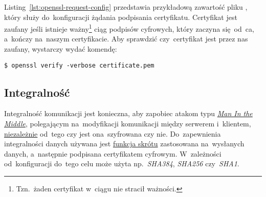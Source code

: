 \documentclass[thesis]{subfiles}
\begin{document}
Listing~\ref{lst:openssl-request-config} przedstawia przykładową zawartość pliku , który służy do~konfiguracji żądania podpisania certyfikatu. Certyfikat jest zaufany jeśli istnieje ważny\footnote{Tzn.~żaden certyfikat w~ciągu nie stracił ważności.} ciąg podpisów cyfrowych, który zaczyna się~od~\gls{ca}, a~kończy na~naszym certyfikacie. Aby sprawdzić czy~certyfikat jest przez nas zaufany, wystarczy wydać komendę:
\begin{lstlisting}[numbers=none]
$ openssl verify -verbose certificate.pem
\end{lstlisting}


\subsection{Integralność}

Integralność komunikacji jest konieczna, aby zapobiec atakom typu \emph{\hyperlink{itm:mitm}{Man In the Middle}}, polegającym na~modyfikacji komunikacji między serwerem i~klientem, \href{https://en.wikipedia.org/wiki/Digital_signature\#Integrity}{niezależnie} od~tego czy jest ona~szyfrowana czy nie. Do~zapewnienia integralności danych używana jest \href{https://www.ibm.com/support/knowledgecenter/SSFKSJ_7.0.1/com.ibm.mq.csqzas.doc/sy11300_.htm}{funkcja skrótu} zastosowana na~wysłanych danych, a~następnie podpisana certyfikatem cyfrowym. W~zależności od~konfiguracji do~tego celu może użyta np.~\emph{SHA384}, \emph{SHA256} czy~\emph{SHA1}.
\end{document}
